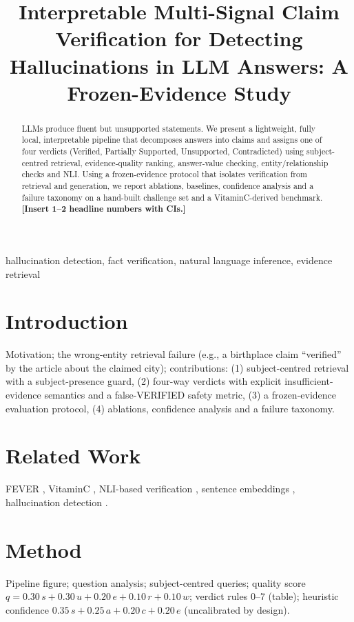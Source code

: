 \documentclass[conference]{IEEEtran}
\begin{document}
\title{Interpretable Multi-Signal Claim Verification for Detecting Hallucinations in LLM Answers: A Frozen-Evidence Study}
\author{
}
\maketitle

\begin{abstract}
LLMs produce fluent but unsupported statements. We present a lightweight, fully local, interpretable
pipeline that decomposes answers into claims and assigns one of four verdicts (Verified, Partially
Supported, Unsupported, Contradicted) using subject-centred retrieval, evidence-quality ranking,
answer-value checking, entity/relationship checks and NLI. Using a frozen-evidence protocol that
isolates verification from retrieval and generation, we report ablations, baselines, confidence
analysis and a failure taxonomy on a hand-built challenge set and a VitaminC-derived benchmark.
\textbf{[Insert 1--2 headline numbers with CIs.]}
\end{abstract}

\begin{IEEEkeywords}
hallucination detection, fact verification, natural language inference, evidence retrieval
\end{IEEEkeywords}

\section{Introduction}
Motivation; the wrong-entity retrieval failure (e.g., a birthplace claim ``verified'' by the article
about the claimed city); contributions: (1) subject-centred retrieval with a subject-presence guard,
(2) four-way verdicts with explicit insufficient-evidence semantics and a false-VERIFIED safety metric,
(3) a frozen-evidence evaluation protocol, (4) ablations, confidence analysis and a failure taxonomy.

\section{Related Work}
FEVER \cite{fever}, VitaminC \cite{vitaminc}, NLI-based verification \cite{mnli,bart},
sentence embeddings \cite{sbert}, hallucination detection \cite{selfcheck}.

\section{Method}
Pipeline figure; question analysis; subject-centred queries; quality score
$q = 0.30\,s + 0.30\,u + 0.20\,e + 0.10\,r + 0.10\,w$; verdict rules 0--7 (table);
heuristic confidence $0.35\,s+0.25\,a+0.20\,c+0.20\,e$ (uncalibrated by design).
\end{document}
